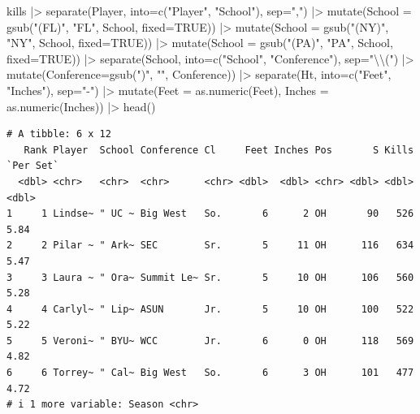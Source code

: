 \documentclass[
  letterpaper,
  DIV=11,
  numbers=noendperiod]{scrreprt}
\newenvironment{Shaded}{\begin{snugshade}}{\end{snugshade}}
\newcommand{\AttributeTok}[1]{\textcolor[rgb]{0.40,0.45,0.13}{#1}}
\newcommand{\ConstantTok}[1]{\textcolor[rgb]{0.56,0.35,0.01}{#1}}
\newcommand{\FunctionTok}[1]{\textcolor[rgb]{0.28,0.35,0.67}{#1}}
\newcommand{\NormalTok}[1]{\textcolor[rgb]{0.00,0.23,0.31}{#1}}
\newcommand{\SpecialCharTok}[1]{\textcolor[rgb]{0.37,0.37,0.37}{#1}}
\newcommand{\StringTok}[1]{\textcolor[rgb]{0.13,0.47,0.30}{#1}}
\begin{document}
\begin{Shaded}
\begin{Highlighting}[]
\NormalTok{kills }\SpecialCharTok{|\textgreater{}} 
  \FunctionTok{separate}\NormalTok{(Player, }\AttributeTok{into=}\FunctionTok{c}\NormalTok{(}\StringTok{"Player"}\NormalTok{, }\StringTok{"School"}\NormalTok{), }\AttributeTok{sep=}\StringTok{","}\NormalTok{) }\SpecialCharTok{|\textgreater{}} 
  \FunctionTok{mutate}\NormalTok{(}\AttributeTok{School =} \FunctionTok{gsub}\NormalTok{(}\StringTok{"(FL)"}\NormalTok{, }\StringTok{"FL"}\NormalTok{, School, }\AttributeTok{fixed=}\ConstantTok{TRUE}\NormalTok{)) }\SpecialCharTok{|\textgreater{}}
  \FunctionTok{mutate}\NormalTok{(}\AttributeTok{School =} \FunctionTok{gsub}\NormalTok{(}\StringTok{"(NY)"}\NormalTok{, }\StringTok{"NY"}\NormalTok{, School, }\AttributeTok{fixed=}\ConstantTok{TRUE}\NormalTok{)) }\SpecialCharTok{|\textgreater{}}
  \FunctionTok{mutate}\NormalTok{(}\AttributeTok{School =} \FunctionTok{gsub}\NormalTok{(}\StringTok{"(PA)"}\NormalTok{, }\StringTok{"PA"}\NormalTok{, School, }\AttributeTok{fixed=}\ConstantTok{TRUE}\NormalTok{)) }\SpecialCharTok{|\textgreater{}}
  \FunctionTok{separate}\NormalTok{(School, }\AttributeTok{into=}\FunctionTok{c}\NormalTok{(}\StringTok{"School"}\NormalTok{, }\StringTok{"Conference"}\NormalTok{), }\AttributeTok{sep=}\StringTok{"}\SpecialCharTok{\textbackslash{}\textbackslash{}}\StringTok{("}\NormalTok{) }\SpecialCharTok{|\textgreater{}} 
  \FunctionTok{mutate}\NormalTok{(}\AttributeTok{Conference=}\FunctionTok{gsub}\NormalTok{(}\StringTok{")"}\NormalTok{, }\StringTok{""}\NormalTok{, Conference)) }\SpecialCharTok{|\textgreater{}}
  \FunctionTok{separate}\NormalTok{(Ht, }\AttributeTok{into=}\FunctionTok{c}\NormalTok{(}\StringTok{"Feet"}\NormalTok{, }\StringTok{"Inches"}\NormalTok{), }\AttributeTok{sep=}\StringTok{"{-}"}\NormalTok{) }\SpecialCharTok{|\textgreater{}}
  \FunctionTok{mutate}\NormalTok{(}\AttributeTok{Feet =} \FunctionTok{as.numeric}\NormalTok{(Feet), }\AttributeTok{Inches =} \FunctionTok{as.numeric}\NormalTok{(Inches)) }\SpecialCharTok{|\textgreater{}}
  \FunctionTok{head}\NormalTok{()}
\end{Highlighting}
\end{Shaded}

\begin{verbatim}
# A tibble: 6 x 12
   Rank Player  School Conference Cl     Feet Inches Pos       S Kills `Per Set`
  <dbl> <chr>   <chr>  <chr>      <chr> <dbl>  <dbl> <chr> <dbl> <dbl>     <dbl>
1     1 Lindse~ " UC ~ Big West   So.       6      2 OH       90   526      5.84
2     2 Pilar ~ " Ark~ SEC        Sr.       5     11 OH      116   634      5.47
3     3 Laura ~ " Ora~ Summit Le~ Sr.       5     10 OH      106   560      5.28
4     4 Carlyl~ " Lip~ ASUN       Jr.       5     10 OH      100   522      5.22
5     5 Veroni~ " BYU~ WCC        Jr.       6      0 OH      118   569      4.82
6     6 Torrey~ " Cal~ Big West   So.       6      3 OH      101   477      4.72
# i 1 more variable: Season <chr>
\end{verbatim}
\end{document}
